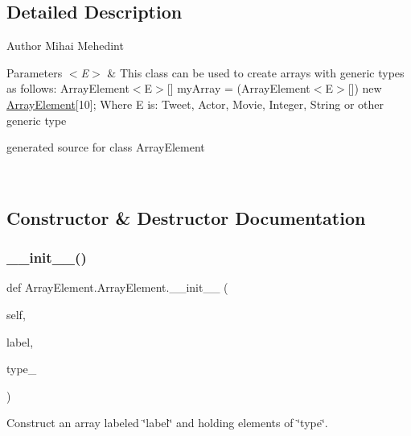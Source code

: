 \subsection{Detailed Description}
\begin{DoxyAuthor}{Author}
Mihai Mehedint 
\end{DoxyAuthor}

\begin{DoxyParams}{Parameters}
{\em $<$\+E$>$} & This class can be used to create arrays with generic types as follows\+: Array\+Element$<$\+E$>$\mbox{[}\mbox{]} my\+Array = (Array\+Element$<$\+E$>$\mbox{[}\mbox{]}) new \hyperlink{class_array_element_1_1_array_element}{Array\+Element}\mbox{[}10\mbox{]}; Where E is\+: Tweet, Actor, Movie, Integer, String or other generic type\begin{DoxyVerb}generated source for class ArrayElement \end{DoxyVerb}
 \\
\hline
\end{DoxyParams}


\subsection{Constructor \& Destructor Documentation}
\hypertarget{class_array_element_1_1_array_element_af3861098177a59070ea1fa62377e59bd}{}\label{class_array_element_1_1_array_element_af3861098177a59070ea1fa62377e59bd} 
\subsubsection{\texorpdfstring{\+\_\+\+\_\+init\+\_\+\+\_\+()}{\_\_init\_\_()}}
{\footnotesize\ttfamily def Array\+Element.\+Array\+Element.\+\_\+\+\_\+init\+\_\+\+\_\+ (\begin{DoxyParamCaption}\item[{}]{self,  }\item[{}]{label,  }\item[{}]{type\+\_\+ }\end{DoxyParamCaption})}



Construct an array labeled \char`\"{}label\char`\"{} and holding elements of \char`\"{}type\char`\"{}. 


